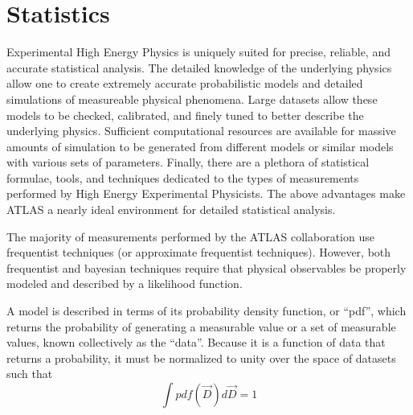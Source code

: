 


\section{Statistics}


Experimental High Energy Physics is uniquely suited for precise, reliable, and accurate statistical analysis.
The detailed knowledge of the underlying physics allow one to create extremely accurate probabilistic models and detailed simulations of measureable physical phenomena.
Large datasets allow these models to be checked, calibrated, and finely tuned to better describe the underlying physics.
Sufficient computational resources are available for massive amounts of simulation to be generated from different models or similar models with various sets of parameters.
Finally, there are a plethora of statistical formulae, tools, and techniques dedicated to the types of measurements performed by High Energy Experimental Physicists.
The above advantages make ATLAS a nearly ideal environment for detailed statistical analysis.


The majority of measurements performed by the ATLAS collaboration use frequentist techniques (or approximate frequentist techniques).
However, both frequentist and bayesian techniques require that physical observables be properly modeled and described by a likelihood function.

A model is described in terms of its probability density function, or ``pdf'', which returns the probability of generating a measurable value or a set of measurable values, known collectively as the ``data''.
Because it is a function of data that returns a probability, it must be normalized to unity over the space of datasets such that
\begin{equation}
\int pdf(\vec{D}) d\vec{D} = 1
\end{equation}

